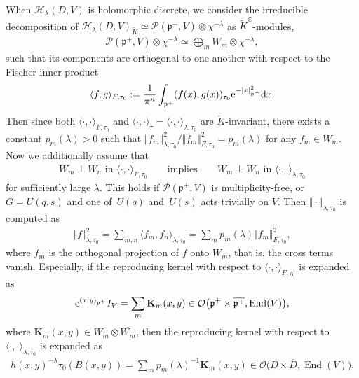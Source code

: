 \documentclass[pdftex]{sigma}
\numberwithin{equation}{section}
\newcommand{\bK}{\mathbf{K}}
\newcommand{\BC}{\mathbb{C}}
\newcommand{\fp}{\mathfrak{p}}
\newcommand{\cH}{\mathcal{H}}
\newcommand{\cO}{\mathcal{O}}
\newcommand{\cP}{\mathcal{P}}
\newcommand{\End}{\operatorname{End}}
\begin{document}
When $\cH_\lambda(D,V)$ is holomorphic discrete, we consider the irreducible decomposition of \linebreak
$\cH_\lambda(D,V)_{\tilde{K}}\simeq \cP(\fp^+,V)\otimes \chi^{-\lambda}$ as $\tilde{K}^\BC$-modules,
\begin{gather*} \cP(\fp^+,V)\otimes \chi^{-\lambda}\simeq \bigoplus_m W_m\otimes\chi^{-\lambda}, \end{gather*}
such that its components are orthogonal to one another with respect to the Fischer inner product
\begin{gather*} \langle f,g\rangle_{F,\tau_0}:=\frac{1}{\pi^n}\int_{\fp^+} (f(x),g(x) )_{\tau_0}{\rm e}^{-|x|_{\fp^+}^2}{\rm d}x. \end{gather*}
Then since both $\langle \cdot,\cdot\rangle_{F,\tau_0}$ and
$\langle\cdot,\cdot\rangle_{\hat{\tau}}=\langle \cdot,\cdot\rangle_{\lambda,\tau_0}$ are $\tilde{K}$-invariant,
there exists a constant $p_m(\lambda)>0$ such that $\Vert f_m\Vert^2_{\lambda,\tau_0}/\Vert f_m\Vert^2_{F,\tau_0}=p_m(\lambda)$
for any $f_m\in W_m$.
Now we additionally assume that
\begin{gather}\label{assumption_orth}
W_m\perp W_n \text{ in } \langle\cdot,\cdot\rangle_{F,\tau_0}\qquad \text{implies}\qquad
W_m\perp W_n \text{ in } \langle\cdot,\cdot\rangle_{\lambda,\tau_0}
\end{gather}
for sufficiently large $\lambda$.
This holds if $\cP(\fp^+,V)$ is multiplicity-free, or $G=U(q,s)$ and one of~$U(q)$ and~$U(s)$ acts trivially on $V$.
Then $\Vert \cdot\Vert_{\lambda,\tau_0}$ is computed as
\begin{gather}\label{norm_compare}
\Vert f\Vert_{\lambda,\tau_0}^2=\sum_{m,n}\langle f_m,f_n\rangle_{\lambda,\tau_0}=\sum_m p_m(\lambda)\Vert f_m\Vert_{F,\tau_0}^2,
\end{gather}
where $f_m$ is the orthogonal projection of $f$ onto $W_m$, that is, the cross terms vanish.
Especially, if the reproducing kernel with respect to $\langle\cdot,\cdot\rangle_{F,\tau_0}$ is expanded as
\begin{gather*} {\rm e}^{(x|y)_{\fp^+}}I_V=\sum_m \bK_m(x,y)\in\cO\big(\fp^+\times\overline{\fp^+},\End(V)\big), \end{gather*}
where  $\bK_m(x,y)\in W_m\otimes\overline{W_m}$, then the reproducing kernel with respect to $\langle\cdot,\cdot\rangle_{\lambda,\tau_0}$ is expanded as
\begin{gather}\label{kernel_expansion}
h(x,y)^{-\lambda}\tau_0(B(x,y))=\sum_m p_m(\lambda)^{-1}\bK_m(x,y)\in\cO\big(D\times\overline{D},\End(V)\big).
\end{gather}
\end{document}
